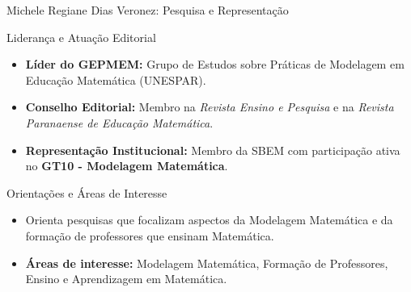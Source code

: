 \documentclass[10pt, aspectratio=169]{beamer}
\begin{document}
\begin{frame}{Michele Regiane Dias Veronez: Pesquisa e Representação}
    \transdissolve[duration=0.4]
    \footnotesize
    \begin{exampleblock}{Liderança e Atuação Editorial}
        \begin{itemize}
            \item \textbf{Líder do GEPMEM:} Grupo de Estudos sobre Práticas de Modelagem em Educação Matemática (UNESPAR).
            \item \textbf{Conselho Editorial:} Membro na \emph{Revista Ensino e Pesquisa} e na \emph{Revista Paranaense de Educação Matemática}.
            \item \textbf{Representação Institucional:} Membro da SBEM com participação ativa no \textbf{GT10 - Modelagem Matemática}.
        \end{itemize}
    \end{exampleblock}
    \pause
    \begin{block}{Orientações e Áreas de Interesse}
        \begin{itemize}
            \item Orienta pesquisas que focalizam aspectos da Modelagem Matemática e da formação de professores que ensinam Matemática.
            \item \textbf{Áreas de interesse:} Modelagem Matemática, Formação de Professores, Ensino e Aprendizagem em Matemática.
        \end{itemize}
    \end{block}
\end{frame}
\end{document}

